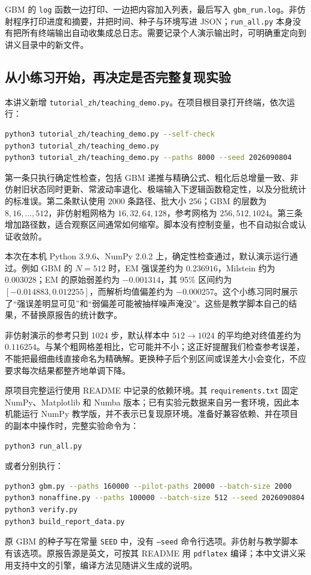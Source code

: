 \documentclass[11pt,a4paper,fontset=none]{ctexart}
\numberwithin{equation}{section}
\begin{document}
GBM 的 \texttt{log} 函数一边打印、一边把内容加入列表，最后写入 \texttt{gbm\_run.log}。非仿射程序打印进度和摘要，并把时间、种子与环境写进 JSON；\texttt{run\_all.py} 本身没有把所有终端输出自动收集成总日志。需要记录个人演示输出时，可明确重定向到讲义目录中的新文件。

\subsection{从小练习开始，再决定是否完整复现实验}

本讲义新增 \texttt{tutorial\_zh/teaching\_demo.py}。在项目根目录打开终端，依次运行：
\begin{lstlisting}[language=bash]
python3 tutorial_zh/teaching_demo.py --self-check
python3 tutorial_zh/teaching_demo.py
python3 tutorial_zh/teaching_demo.py --paths 8000 --seed 2026090804
\end{lstlisting}
第一条只执行确定性检查，包括 GBM 递推与精确公式、粗化后总增量一致、非仿射旧状态同时更新、常波动率退化、极端输入下逻辑函数稳定性，以及分批统计的标准误。第二条默认使用 2000 条路径、批大小 256；GBM 的层数为 $8,16,\ldots,512$，非仿射粗网格为 $16,32,64,128$，参考网格为 $256,512,1024$。第三条增加路径数，适合观察区间通常如何缩窄。脚本没有控制变量，也不自动拟合或认证收敛阶。

本次在本机 Python 3.9.6、NumPy 2.0.2 上，确定性检查通过，默认演示运行通过。例如 GBM 的 $N=512$ 时，EM 强误差约为 $0.236916$，Milstein 约为 $0.003028$；EM 的原始弱差约为 $-0.001314$，其 95\% 区间约为 $[-0.014883,0.012255]$，而解析均值偏差约为 $-0.000257$。这个小练习同时展示了“强误差明显可见”和“弱偏差可能被抽样噪声淹没”。这些是教学脚本自己的结果，不替换原报告的统计数字。

非仿射演示的参考只到 1024 步，默认样本中 $512\to1024$ 的平均绝对终值差约为 $0.116254$。与某个粗网格差相比，它可能并不小；这正好提醒我们检查参考误差，不能把最细曲线直接命名为精确解。更换种子后个别区间或误差大小会变化，不应要求每次结果都整齐地单调下降。

原项目完整运行使用 README 中记录的依赖环境。其 \texttt{requirements.txt} 固定 NumPy、Matplotlib 和 Numba 版本；已有实验元数据来自另一套环境，因此本机能运行 NumPy 教学版，并不表示已复现原环境。准备好兼容依赖、并在项目的副本中操作时，完整实验命令为：
\begin{lstlisting}[language=bash]
python3 run_all.py
\end{lstlisting}
或者分别执行：
\begin{lstlisting}[language=bash]
python3 gbm.py --paths 160000 --pilot-paths 20000 --batch-size 2000
python3 nonaffine.py --paths 100000 --batch-size 512 --seed 2026090804
python3 verify.py
python3 build_report_data.py
\end{lstlisting}
原 GBM 的种子写在常量 \texttt{SEED} 中，没有 \texttt{--seed} 命令行选项。非仿射与教学脚本有该选项。原报告源是英文，可按其 README 用 \texttt{pdflatex} 编译；本中文讲义采用支持中文的引擎，编译方法见随讲义生成的说明。
\end{document}
